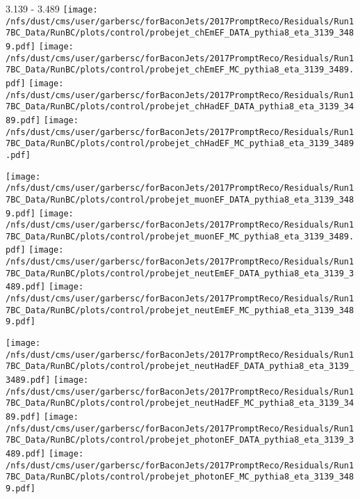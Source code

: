 \documentclass[t,compress]{beamer}
\begin{document}
\begin{frame}{3.139 - 3.489}
	\texttt{[image: /nfs/dust/cms/user/garbersc/forBaconJets/2017PromptReco/Residuals/Run17BC\_Data/RunBC/plots/control/probejet\_chEmEF\_DATA\_pythia8\_eta\_3139\_3489.pdf]}
	\texttt{[image: /nfs/dust/cms/user/garbersc/forBaconJets/2017PromptReco/Residuals/Run17BC\_Data/RunBC/plots/control/probejet\_chEmEF\_MC\_pythia8\_eta\_3139\_3489.pdf]}
	\texttt{[image: /nfs/dust/cms/user/garbersc/forBaconJets/2017PromptReco/Residuals/Run17BC\_Data/RunBC/plots/control/probejet\_chHadEF\_DATA\_pythia8\_eta\_3139\_3489.pdf]}
	\texttt{[image: /nfs/dust/cms/user/garbersc/forBaconJets/2017PromptReco/Residuals/Run17BC\_Data/RunBC/plots/control/probejet\_chHadEF\_MC\_pythia8\_eta\_3139\_3489.pdf]}
\newline

\vspace{-0.65cm}
	\texttt{[image: /nfs/dust/cms/user/garbersc/forBaconJets/2017PromptReco/Residuals/Run17BC\_Data/RunBC/plots/control/probejet\_muonEF\_DATA\_pythia8\_eta\_3139\_3489.pdf]}
	\texttt{[image: /nfs/dust/cms/user/garbersc/forBaconJets/2017PromptReco/Residuals/Run17BC\_Data/RunBC/plots/control/probejet\_muonEF\_MC\_pythia8\_eta\_3139\_3489.pdf]}
	\texttt{[image: /nfs/dust/cms/user/garbersc/forBaconJets/2017PromptReco/Residuals/Run17BC\_Data/RunBC/plots/control/probejet\_neutEmEF\_DATA\_pythia8\_eta\_3139\_3489.pdf]}
	\texttt{[image: /nfs/dust/cms/user/garbersc/forBaconJets/2017PromptReco/Residuals/Run17BC\_Data/RunBC/plots/control/probejet\_neutEmEF\_MC\_pythia8\_eta\_3139\_3489.pdf]}
\newline

\vspace{-0.65cm}
	\texttt{[image: /nfs/dust/cms/user/garbersc/forBaconJets/2017PromptReco/Residuals/Run17BC\_Data/RunBC/plots/control/probejet\_neutHadEF\_DATA\_pythia8\_eta\_3139\_3489.pdf]}
	\texttt{[image: /nfs/dust/cms/user/garbersc/forBaconJets/2017PromptReco/Residuals/Run17BC\_Data/RunBC/plots/control/probejet\_neutHadEF\_MC\_pythia8\_eta\_3139\_3489.pdf]}
	\texttt{[image: /nfs/dust/cms/user/garbersc/forBaconJets/2017PromptReco/Residuals/Run17BC\_Data/RunBC/plots/control/probejet\_photonEF\_DATA\_pythia8\_eta\_3139\_3489.pdf]}
	\texttt{[image: /nfs/dust/cms/user/garbersc/forBaconJets/2017PromptReco/Residuals/Run17BC\_Data/RunBC/plots/control/probejet\_photonEF\_MC\_pythia8\_eta\_3139\_3489.pdf]}
\end{frame}
\end{document}
